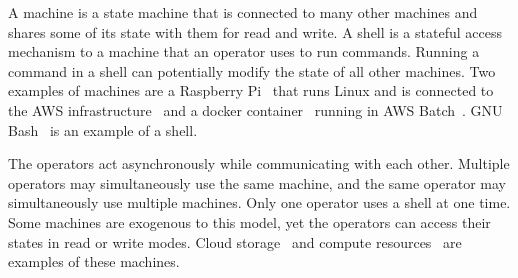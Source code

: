 A machine is a state machine that is connected to many other machines and shares some of its state with them for read and write. A shell is a stateful access mechanism to a machine that an operator uses to run commands. Running a command in a shell can potentially modify the state of all other machines. Two examples of machines are a Raspberry Pi~\cite{rpi} that runs Linux and is connected to the AWS infrastructure~\cite{aws} and a docker container~\cite{docker} running in AWS Batch~\cite{aws_batch}. GNU Bash~\cite{gnu_bash} is an example of a shell.

The operators act asynchronously while communicating with each other. Multiple operators may simultaneously use the same machine, and the same operator may simultaneously use multiple machines. Only one operator uses a shell at one time. Some machines are exogenous to this model, yet the operators can access their states in read or write modes. Cloud storage~\cite{aws_s3} and compute resources~\cite{aws_batch} are examples of these machines.